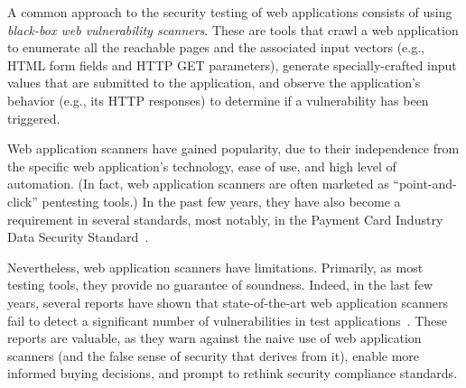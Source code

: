 
A common approach to the security testing of web applications consists
of using {\em black-box web vulnerability scanners}.
These are tools that
crawl a web
application to enumerate all the reachable pages and the associated input vectors
(e.g., HTML form fields and HTTP GET parameters), generate specially-crafted input
values that are submitted to the application, and observe the
application's behavior (e.g., its HTTP responses) to determine if a
vulnerability has been triggered.

Web application scanners have gained popularity, due to
their independence from the specific web application's technology, ease of
use, and high level of automation. (In fact, web application scanners
are often marketed as ``point-and-click'' pentesting tools.) In the past
few years, they have also become a requirement in several standards,
most notably, in the Payment Card Industry Data Security
Standard~\cite{pci}.


Nevertheless, web application scanners have limitations. 
Primarily, as most testing tools, they provide no guarantee of
soundness.
Indeed, in the last few years, several reports have shown that
state-of-the-art web application scanners fail to detect a significant
number of vulnerabilities in test applications~\cite{suto07,suto10webscanners,wiegenstein06,peine06,anantasec09}.
These reports are valuable, as they warn against the naive use of web
application scanners (and the false sense of security that derives from
it), enable more informed buying decisions, and  prompt to rethink
security compliance standards. 

